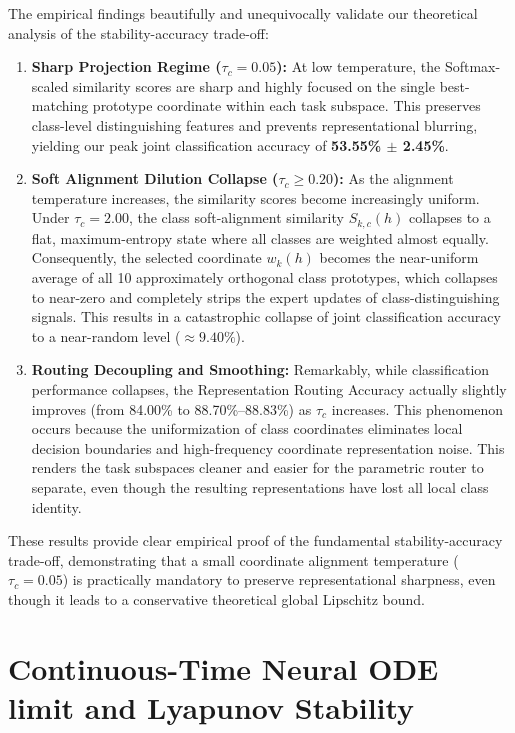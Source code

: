 \documentclass{article}
\theoremstyle{plain}
\theoremstyle{definition}
\theoremstyle{remark}
\begin{document}
The empirical findings beautifully and unequivocally validate our theoretical analysis of the stability-accuracy trade-off:
\begin{enumerate}
  \item \textbf{Sharp Projection Regime ($\tau_c = 0.05$):} At low temperature, the Softmax-scaled similarity scores are sharp and highly focused on the single best-matching prototype coordinate within each task subspace. This preserves class-level distinguishing features and prevents representational blurring, yielding our peak joint classification accuracy of \textbf{53.55\% $\pm$ 2.45\%}.
  \item \textbf{Soft Alignment Dilution Collapse ($\tau_c \ge 0.20$):} As the alignment temperature increases, the similarity scores become increasingly uniform. Under $\tau_c = 2.00$, the class soft-alignment similarity $S_{k, c}(h)$ collapses to a flat, maximum-entropy state where all classes are weighted almost equally. Consequently, the selected coordinate $w_k(h)$ becomes the near-uniform average of all 10 approximately orthogonal class prototypes, which collapses to near-zero and completely strips the expert updates of class-distinguishing signals. This results in a catastrophic collapse of joint classification accuracy to a near-random level ($\approx 9.40\%$).
  \item \textbf{Routing Decoupling and Smoothing:} Remarkably, while classification performance collapses, the Representation Routing Accuracy actually slightly improves (from 84.00\% to 88.70\%--88.83\%) as $\tau_c$ increases. This phenomenon occurs because the uniformization of class coordinates eliminates local decision boundaries and high-frequency coordinate representation noise. This renders the task subspaces cleaner and easier for the parametric router to separate, even though the resulting representations have lost all local class identity.
\end{enumerate}
These results provide clear empirical proof of the fundamental stability-accuracy trade-off, demonstrating that a small coordinate alignment temperature ($\tau_c = 0.05$) is practically mandatory to preserve representational sharpness, even though it leads to a conservative theoretical global Lipschitz bound.

\section{Continuous-Time Neural ODE limit and Lyapunov Stability}
\label{appendix:neural_ode}
\end{document}
